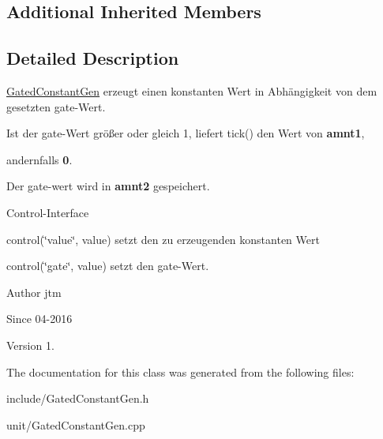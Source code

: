 \subsection*{Additional Inherited Members}


\subsection{Detailed Description}
\hyperlink{classunit_1_1GatedConstantGen}{Gated\-Constant\-Gen} erzeugt einen konstanten Wert in Abhängigkeit von dem gesetzten gate-\/\-Wert.


\begin{DoxyItemize}
\item Ist der gate-\/\-Wert größer oder gleich 1, liefert tick() den Wert von {\bfseries amnt1},
\item andernfalls {\bfseries 0}.
\item Der gate-\/wert wird in {\bfseries amnt2} gespeichert.
\end{DoxyItemize}

Control-\/\-Interface


\begin{DoxyItemize}
\item control(\char`\"{}value\char`\"{}, value) setzt den zu erzeugenden konstanten Wert
\item control(\char`\"{}gate\char`\"{}, value) setzt den gate-\/\-Wert.
\end{DoxyItemize}

\begin{DoxyAuthor}{Author}
jtm 
\end{DoxyAuthor}
\begin{DoxySince}{Since}
04-\/2016 
\end{DoxySince}
\begin{DoxyVersion}{Version}
1. 
\end{DoxyVersion}


The documentation for this class was generated from the following files\-:\begin{DoxyCompactItemize}
\item 
include/Gated\-Constant\-Gen.\-h\item 
unit/Gated\-Constant\-Gen.\-cpp\end{DoxyCompactItemize}
